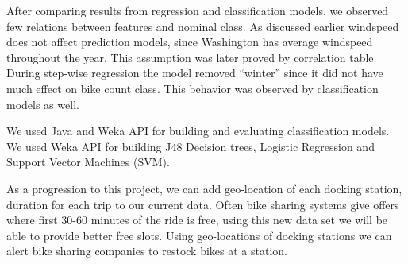 \documentclass[12pt]{article}
\newcommand{\bibfile}{GroupProject}
\newcommand{\ci}[1]{\cite{#1}}
\begin{document}

After comparing results from regression and classification models, we observed
few relations between features and nominal class. As discussed earlier
windspeed does not affect prediction models, since Washington has average
windspeed throughout the year. This assumption was later proved by correlation
table. During step-wise regression the model removed ``winter'' since it did not
have much effect on bike count class. This behavior was observed by
classification models as well.

We used Java and Weka\ci{hall2009weka} API for building and evaluating
classification models. We used Weka API for building J48 Decision trees,
Logistic Regression and Support Vector Machines (SVM).



As a progression to this project, we can add geo-location of each docking
station, duration for each trip to our current data. Often bike sharing systems
give offers where first 30-60 minutes of the ride is free, using this new data
set we will be able to provide better free slots. Using geo-locations of
docking stations we can alert bike sharing companies to restock bikes at a
station.



\end{document}
